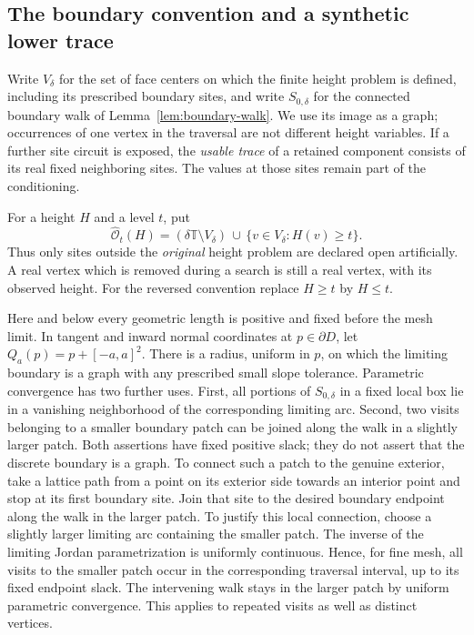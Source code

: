 \documentclass[11pt]{article}
\theoremstyle{definition}
\theoremstyle{remark}
\numberwithin{equation}{section}
\begin{document}
\subsection{The boundary convention and a synthetic lower trace}

Write $V_\delta$ for the set of face centers on which the finite height
problem is defined, including its prescribed boundary sites, and write
$S_{0,\delta}$ for the connected boundary walk of
Lemma~\ref{lem:boundary-walk}.  We use its image as a graph; occurrences
of one vertex in the traversal are not different height variables.
If a further site circuit is exposed, the \emph{usable trace} of a
retained component consists of its real fixed neighboring sites.  The
values at those sites remain part of the conditioning.

For a height $H$ and a level $t$, put
\begin{equation}
 \widehat{\mathcal O}_t(H)
 = (\delta\mathbb T\setminus V_\delta)
   \,\cup\,\{v\in V_\delta:H(v)\ge t\}.
 \label{boundary:artificial-exterior}
\end{equation}
Thus only sites outside the \emph{original} height problem are declared
open artificially.  A real vertex which is removed during a search is
still a real vertex, with its observed height.  For the reversed
convention replace $H\ge t$ by $H\le t$.

Here and below every geometric length is positive and fixed before the
mesh limit.  In tangent and inward normal coordinates at
$p\in\partial D$, let $Q_a(p)=p+[-a,a]^2$.  There is a radius, uniform in
$p$, on which the limiting boundary is a graph with any prescribed
small slope tolerance.  Parametric convergence has two further uses.
First, all portions of $S_{0,\delta}$ in a fixed local box lie in a
vanishing neighborhood of the corresponding limiting arc.  Second,
two visits belonging to a smaller boundary patch can be joined along
the walk in a slightly larger patch.  Both assertions have fixed
positive slack; they do not assert that the discrete boundary is a
graph.  To connect such a patch to the genuine exterior, take a lattice
path from a point on its exterior side towards an interior point and
stop at its first boundary site.  Join that site to the desired
boundary endpoint along the walk in the larger patch.  To justify this
local connection, choose a slightly larger limiting arc containing the
smaller patch.  The inverse of the limiting Jordan
parametrization is uniformly continuous.  Hence, for fine mesh, all
visits to the smaller patch occur in the corresponding traversal
interval, up to its fixed endpoint slack.  The intervening walk stays
in the larger patch by uniform parametric convergence.  This applies
to repeated visits as well as distinct vertices.
\end{document}
